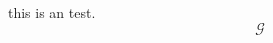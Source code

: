 \documentclass{article}
\begin{document}
this is an test.
\begin{equation*}
   \mathcal{G}
\end{equation*}
\end{document}
